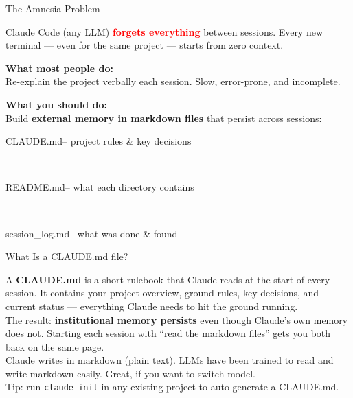 \documentclass[aspectratio=169, 11pt]{beamer}
\newcommand{\emphgold}[1]{\alert{\textbf{#1}}}
\newcommand{\emphcoral}[1]{\textcolor{red}{\textbf{#1}}}
\newcommand{\codett}[1]{{\ttfamily\scriptsize\raggedright\hyphenpenalty=50\exhyphenpenalty=50 #1}}
\begin{document}
\begin{frame}{The Amnesia Problem}
\begin{warningbox}
  {\small Claude Code (any LLM) \emphcoral{forgets everything} between sessions. Every new terminal --- even for the same project --- starts from zero context.}
\end{warningbox}
\vspace{0.1cm}
  {\small\bfseries\color{navy} What most people do:}\\[0.03cm]
  {\small Re-explain the project verbally each session. Slow, error-prone, and incomplete.}
  \vspace{0.15cm}

  {\small\bfseries\color{navy} What you should do:}\\[0.03cm]
  {\small Build \emphgold{external memory in markdown files} that persist across sessions:}
  \vspace{0.05cm}
  \begin{codeblock}
    \codett{\textcolor{warmgold}{CLAUDE.md}\quad\textcolor{slate}{-- project rules \& key decisions}}\\
    \codett{\textcolor{warmgold}{README.md}\quad\textcolor{slate}{-- what each directory contains}}\\
    \codett{\textcolor{warmgold}{session\_log.md}\;\textcolor{slate}{-- what was done \& found}}
  \end{codeblock}
\end{frame}

\begin{frame}{What Is a CLAUDE.md file?}
  \begin{keyinsight}
    A \emphgold{CLAUDE.md} is a short rulebook that Claude reads at the start of every session. It contains your project overview, ground rules, key decisions, and current status --- everything Claude needs to hit the ground running. \\[6pt]
    The result: \emphgold{institutional memory persists} even though Claude's own memory does not. Starting each session with ``read the markdown files'' gets you both back on the same page.\\[6pt]
    Claude writes in markdown (plain text). LLMs have been trained to read and write markdown easily. Great, if you want to switch model.\\[6pt]
    {\scriptsize\color{slate} Tip: run \texttt{claude init} in any existing project to auto-generate a CLAUDE.md.}
  \end{keyinsight}
\end{frame}
\end{document}
